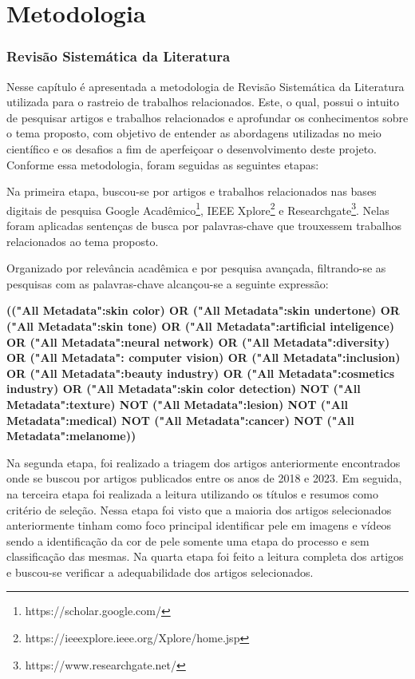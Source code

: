 \chapter{Metodologia}
\label{cap:metodologia}

\subsection{Revisão Sistemática da Literatura}
 Nesse capítulo é apresentada a metodologia de Revisão Sistemática da Literatura utilizada para o rastreio de trabalhos relacionados. Este, o qual, possui o intuito de pesquisar artigos e trabalhos relacionados e aprofundar os conhecimentos sobre o tema proposto, com objetivo de entender as abordagens utilizadas no meio científico e os desafios a fim de aperfeiçoar o desenvolvimento deste projeto. Conforme essa metodologia, foram seguidas as seguintes etapas:
 
Na primeira etapa, buscou-se por artigos e trabalhos relacionados nas bases digitais de pesquisa Google Acadêmico\footnote{https://scholar.google.com/}, IEEE Xplore\footnote{https://ieeexplore.ieee.org/Xplore/home.jsp} e Researchgate\footnote{https://www.researchgate.net/}. Nelas foram aplicadas sentenças de busca por palavras-chave que trouxessem trabalhos relacionados ao tema proposto. 

Organizado por relevância acadêmica e por pesquisa avançada, filtrando-se as pesquisas com as palavras-chave alcançou-se a seguinte expressão:

\begin{center}
\centering
\textbf{(("All Metadata":skin color) OR ("All Metadata":skin undertone) OR ("All Metadata":skin tone) OR ("All Metadata":artificial inteligence) OR ("All Metadata":neural network) OR ("All Metadata":diversity) OR ("All Metadata": computer vision) OR ("All Metadata":inclusion) OR ("All Metadata":beauty industry) OR ("All Metadata":cosmetics industry) OR ("All Metadata":skin color detection) NOT ("All Metadata":texture) NOT ("All Metadata":lesion) NOT ("All Metadata":medical) NOT ("All Metadata":cancer) NOT ("All Metadata":melanome))}
\end{center}


Na segunda etapa, foi realizado a triagem dos artigos anteriormente encontrados onde se buscou por artigos publicados entre os anos de 2018 e 2023. Em seguida, na terceira etapa foi realizada a leitura utilizando os títulos e resumos como critério de seleção. Nessa etapa foi visto que a maioria dos artigos selecionados anteriormente tinham como foco principal identificar pele em imagens e vídeos sendo a identificação da cor de pele somente uma etapa do processo e sem classificação das mesmas. Na quarta etapa foi feito a leitura completa dos artigos e buscou-se verificar a adequabilidade dos artigos selecionados. 

